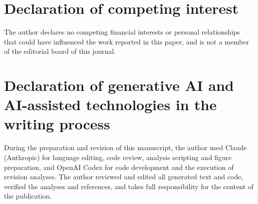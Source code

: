 \documentclass[preprint,12pt]{elsarticle}
\begin{document}
\section*{Declaration of competing interest}

The author declares no competing financial interests or personal relationships that could have influenced the work reported in this paper, and is not a member of the editorial board of this journal.

\section*{Declaration of generative AI and AI-assisted technologies in the writing process}

During the preparation and revision of this manuscript, the author used Claude (Anthropic) for language editing, code review, analysis scripting and figure preparation, and OpenAI Codex for code development and the execution of revision analyses. The author reviewed and edited all generated text and code, verified the analyses and references, and takes full responsibility for the content of the publication.



\end{document}
